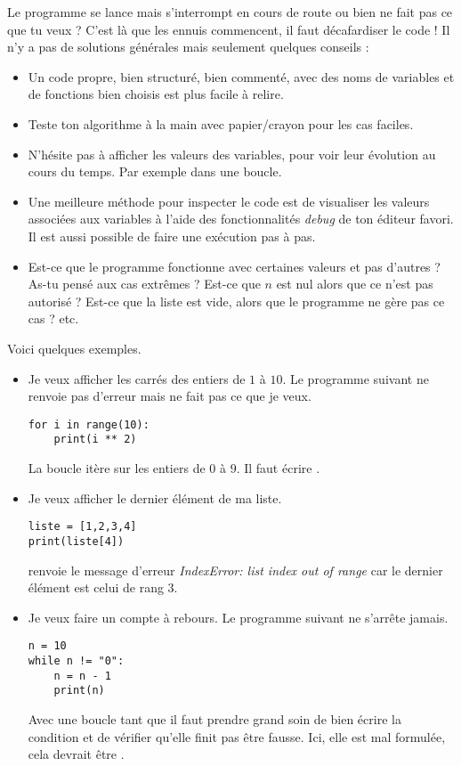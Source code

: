\documentclass[11pt,class=report,crop=false]{standalone}
\begin{document}
Le programme se lance mais s’interrompt en cours de route ou bien ne fait pas ce que tu veux ? C'est là que les ennuis commencent, il faut décafardiser le code !  Il n'y a pas de solutions générales mais seulement quelques conseils :
\begin{itemize}
  \item Un code propre, bien structuré, bien commenté, avec des noms de variables et de fonctions bien choisis est plus facile à relire.

  \item Teste ton algorithme à la main avec papier/crayon pour les cas faciles.

  \item N'hésite pas à afficher les valeurs des variables, pour voir leur évolution au cours du temps. Par exemple  dans une boucle. 
  
  \item Une meilleure méthode pour inspecter le code est de visualiser les valeurs associées aux variables à l'aide des fonctionnalités \emph{debug} de ton éditeur \Python{} favori. Il est aussi possible de faire une exécution pas à pas.

  \item Est-ce que le programme fonctionne avec certaines valeurs et pas d'autres ? As-tu pensé aux cas extrêmes ? Est-ce que $n$ est nul alors que ce n'est pas autorisé ? Est-ce que la liste est vide, alors que le programme ne gère pas ce cas ? etc.
\end{itemize}

 \medskip
 
Voici quelques exemples.

\begin{itemize}
  \item Je veux afficher les carrés des entiers de $1$ à $10$. Le programme suivant ne renvoie pas d'erreur mais ne fait pas ce que je veux.
\begin{lstlisting}
for i in range(10):
    print(i ** 2)
\end{lstlisting}
La boucle itère sur les entiers de $0$ à $9$. Il faut écrire .

  \item  Je veux afficher le dernier élément de ma liste.
\begin{lstlisting}     
liste = [1,2,3,4]
print(liste[4])
\end{lstlisting}  
\Python{} renvoie le message d'erreur \emph{IndexError: list index out of range} car le dernier élément est celui de rang $3$.


  \item Je veux faire un compte à rebours. Le programme suivant ne s'arrête jamais.
\begin{lstlisting}   
n = 10
while n != "0":
    n = n - 1
    print(n)
\end{lstlisting} 
Avec une boucle \og{}tant que\fg{} il faut prendre grand soin de bien écrire la condition et de vérifier qu'elle finit pas être fausse. Ici, elle est mal formulée, cela devrait être .


\end{itemize}
\end{document}
